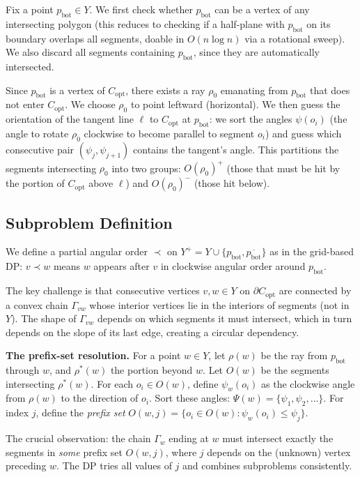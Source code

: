 \documentclass{article}
\begin{document}
Fix a point $p_{\text{bot}} \in Y$. We first check whether $p_{\text{bot}}$ can
be a vertex of any intersecting polygon (this reduces to checking if a
half-plane with $p_{\text{bot}}$ on its boundary overlaps all segments, doable
in $O(n \log n)$ via a rotational sweep). We also discard all segments containing
$p_{\text{bot}}$, since they are automatically intersected.

Since $p_{\text{bot}}$ is a vertex of $C_{\text{opt}}$, there exists a ray
$\rho_0$ emanating from $p_{\text{bot}}$ that does not enter $C_{\text{opt}}$.
We choose $\rho_0$ to point leftward (horizontal). We then guess the orientation
of the tangent line $\ell$ to $C_{\text{opt}}$ at $p_{\text{bot}}$: we sort the
angles $\psi(o_i)$ (the angle to rotate $\rho_0$ clockwise to become parallel to
segment $o_i$) and guess which consecutive pair $(\psi_j, \psi_{j+1})$ contains
the tangent's angle. This partitions the segments intersecting $\rho_0$ into two
groups: $O(\rho_0)^+$ (those that must be hit by the portion of $C_{\text{opt}}$
above $\ell$) and $O(\rho_0)^-$ (those hit below).

\subsection{Subproblem Definition}

We define a partial angular order $\prec$ on $Y^+ = Y \cup \{p_{\text{bot}},
\overline{p_{\text{bot}}}\}$ as in the grid-based DP: $v \prec w$ means $w$
appears after $v$ in clockwise angular order around $p_{\text{bot}}$.

The key challenge is that consecutive vertices $v, w \in Y$ on $\partial
C_{\text{opt}}$ are connected by a convex chain $\Gamma_{vw}$ whose
interior vertices lie in the interiors of segments (not in $Y$). The shape of
$\Gamma_{vw}$ depends on which segments it must intersect, which in turn depends
on the slope of its last edge, creating a circular dependency.

\textbf{The prefix-set resolution.} For a point $w \in Y$, let $\rho(w)$ be the
ray from $p_{\text{bot}}$ through $w$, and $\rho^*(w)$ the portion beyond $w$.
Let $O(w)$ be the segments intersecting $\rho^*(w)$. For each $o_i \in O(w)$,
define $\psi_w(o_i)$ as the clockwise angle from $\rho(w)$ to the direction of
$o_i$. Sort these angles: $\Psi(w) = \{\psi_1, \psi_2, \ldots\}$. For index $j$,
define the \emph{prefix set} $O(w, j) = \{o_i \in O(w) : \psi_w(o_i) \le \psi_j\}$.

The crucial observation: the chain $\Gamma_w$ ending at $w$ must intersect exactly
the segments in \emph{some} prefix set $O(w, j)$, where $j$ depends on the
(unknown) vertex preceding $w$. The DP tries all values of $j$ and combines
subproblems consistently.
\end{document}

